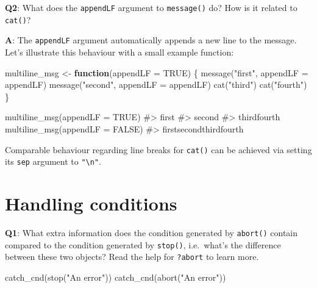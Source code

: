 \documentclass[
]{krantz}
\makeatletter
\newenvironment{Shaded}{\begin{snugshade}}{\end{snugshade}}
\newcommand{\CommentTok}[1]{\textcolor[rgb]{0.56,0.35,0.01}{\textit{#1}}}
\newcommand{\ControlFlowTok}[1]{\textcolor[rgb]{0.13,0.29,0.53}{\textbf{#1}}}
\newcommand{\DataTypeTok}[1]{\textcolor[rgb]{0.13,0.29,0.53}{#1}}
\newcommand{\KeywordTok}[1]{\textcolor[rgb]{0.13,0.29,0.53}{\textbf{#1}}}
\newcommand{\NormalTok}[1]{#1}
\newcommand{\OtherTok}[1]{\textcolor[rgb]{0.56,0.35,0.01}{#1}}
\newcommand{\StringTok}[1]{\textcolor[rgb]{0.31,0.60,0.02}{#1}}
\newenvironment{kframe}{%
\medskip{}
\setlength{\fboxsep}{.8em}
 \def\at@end@of@kframe{}%
 \ifinner\ifhmode%
  \def\at@end@of@kframe{\end{minipage}}%
  \begin{minipage}{\columnwidth}%
 \fi\fi%
 \def\FrameCommand##1{\hskip\@totalleftmargin \hskip-\fboxsep
 \colorbox{shadecolor}{##1}\hskip-\fboxsep
     \hskip-\linewidth \hskip-\@totalleftmargin \hskip\columnwidth}%
 \MakeFramed {\advance\hsize-\width
   \@totalleftmargin\z@ \linewidth\hsize
   \@setminipage}}%
 {\par\unskip\endMakeFramed%
 \at@end@of@kframe}
\renewenvironment{Shaded}{\begin{kframe}}{\end{kframe}}
\renewcommand{\KeywordTok} [1]{\textcolor[rgb]{0.00,0.44,0.13}{{#1}}}
\renewcommand{\DataTypeTok}[1]{\textcolor[rgb]{0.56,0.13,0.00}{{#1}}}
\renewcommand{\StringTok}  [1]{\textcolor[rgb]{0.25,0.44,0.63}{{#1}}}
\renewcommand{\CommentTok} [1]{\textcolor[rgb]{0.38,0.63,0.69}{{#1}}}
\renewcommand{\OtherTok}   [1]{\textcolor[rgb]{0.00,0.44,0.13}{{#1}}}
\renewcommand{\NormalTok}  [1]{{#1}}
\makeatother
\begin{document}
\textbf{{Q2}}: What does the \texttt{appendLF} argument to \texttt{message()} do? How is it related to \texttt{cat()}?

\textbf{{A}}: The \texttt{appendLF} argument automatically appends a new line to the message. Let's illustrate this behaviour with a small example function:

\begin{Shaded}
\begin{Highlighting}[]
\NormalTok{multiline_msg <-}\StringTok{ }\ControlFlowTok{function}\NormalTok{(}\DataTypeTok{appendLF =} \OtherTok{TRUE}\NormalTok{) \{}
  \KeywordTok{message}\NormalTok{(}\StringTok{"first"}\NormalTok{, }\DataTypeTok{appendLF =}\NormalTok{ appendLF)}
  \KeywordTok{message}\NormalTok{(}\StringTok{"second"}\NormalTok{, }\DataTypeTok{appendLF =}\NormalTok{ appendLF)}
  \KeywordTok{cat}\NormalTok{(}\StringTok{"third"}\NormalTok{)}
  \KeywordTok{cat}\NormalTok{(}\StringTok{"fourth"}\NormalTok{)}
\NormalTok{\}}

\KeywordTok{multiline_msg}\NormalTok{(}\DataTypeTok{appendLF =} \OtherTok{TRUE}\NormalTok{)}
\CommentTok{#> first}
\CommentTok{#> second}
\CommentTok{#> thirdfourth}
\KeywordTok{multiline_msg}\NormalTok{(}\DataTypeTok{appendLF =} \OtherTok{FALSE}\NormalTok{)}
\CommentTok{#> firstsecondthirdfourth}
\end{Highlighting}
\end{Shaded}

Comparable behaviour regarding line breaks for \texttt{cat()} can be achieved via setting its \texttt{sep} argument to \texttt{"\textbackslash{}n"}.


\hypertarget{handling-conditions}{%
\section{Handling conditions}\label{handling-conditions}}

\textbf{{Q1}}: What extra information does the condition generated by \texttt{abort()} contain compared to the condition generated by \texttt{stop()}, i.e.~what's the difference between these two objects? Read the help for \texttt{?abort} to learn more.

\begin{Shaded}
\begin{Highlighting}[]
\KeywordTok{catch_cnd}\NormalTok{(}\KeywordTok{stop}\NormalTok{(}\StringTok{"An error"}\NormalTok{))}
\KeywordTok{catch_cnd}\NormalTok{(}\KeywordTok{abort}\NormalTok{(}\StringTok{"An error"}\NormalTok{))}
\end{Highlighting}
\end{Shaded}
\end{document}
